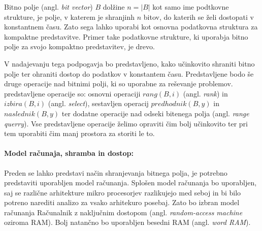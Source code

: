 Bitno polje (angl. \textit{bit vector}) $B$ dolžine $n=|B|$ kot samo ime podtkovne strukture, je polje, v katerem je shranjinh $n$ bitov, do katerih se želi dostopati v konstantnem času. Zato sega lahko uporabi kot osnovna podatkovna struktura za kompaktne predstavitve. Primer take podatkovne strukture, ki uporabja bitno polje za svojo kompaktno predstavitev, je drevo.

V nadajevanju tega podpogavja bo predstavljeno, kako učinkovito shraniti bitno polje ter ohraniti dostop do podatkov v konstantem času. Predstavljene bodo še druge operacije nad bitnimi polji, ki so uporabne za reševanje problemov. predstavljene operacije so: osnovni operaciji $rang(B,i)$ (angl. \textit{rank}) in $izbira(B,i)$ (angl. \textit{select}), sestavljen operacij $predhodnik(B,y)$ in $naslednik(B,y)$ ter dodatne operacije nad odseki bitenega polja (angl. \textit{range querry}). Vse predstavljene operacije želimo opraviti čim bolj učinkovito ter pri tem uporabiti čim manj prostora za storiti le to.

%

\paragraph{Model računaja, shramba in dostop:}
Preden se lahko predstavi način shranjevanja bitnega polja, je potrebno predstaviti uporabljen model računanja. Splošen model računanja bo uporabljen, saj se različne arhitekture mikro procesorjev razlikujejo med seboj in bi bilo potreno narediti analizo za vsako arhitekuro posebaj. Zato bo izbran model računanja Računalnik z naključnim dostopom (angl. \textit{random-access machine} oziroma RAM). Bolj natančno bo uporabljen besedni RAM  (angl. \textit{word RAM}).

